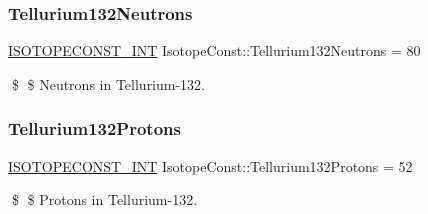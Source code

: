 \subsubsection{\texorpdfstring{Tellurium132\+Neutrons}{Tellurium132Neutrons}}
{\footnotesize\ttfamily \mbox{\hyperlink{group___isotope_const-_macros_ga5f18360b3e99483a35c32d789e62621c}{I\+S\+O\+T\+O\+P\+E\+C\+O\+N\+S\+T\+\_\+\+I\+NT}} Isotope\+Const\+::\+Tellurium132\+Neutrons = 80}

\$ \$ Neutrons in Tellurium-\/132. \mbox{\label{group___isotope_const-_tellurium-_te132_gaf0aa5df2baffe38d65011ba79f5e76c4}} 
\subsubsection{\texorpdfstring{Tellurium132\+Protons}{Tellurium132Protons}}
{\footnotesize\ttfamily \mbox{\hyperlink{group___isotope_const-_macros_ga5f18360b3e99483a35c32d789e62621c}{I\+S\+O\+T\+O\+P\+E\+C\+O\+N\+S\+T\+\_\+\+I\+NT}} Isotope\+Const\+::\+Tellurium132\+Protons = 52}

\$ \$ Protons in Tellurium-\/132. 